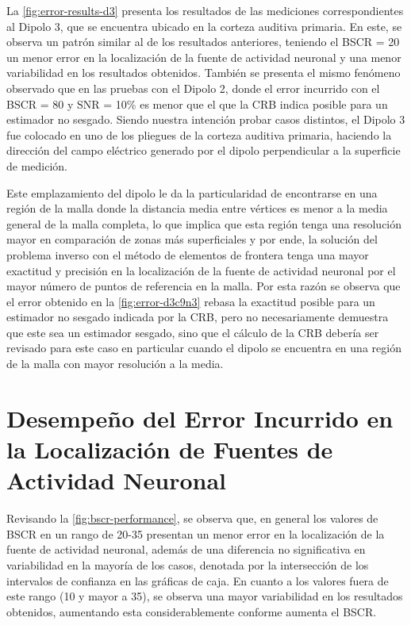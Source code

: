 La \cref{fig:error-results-d3} presenta los resultados de las mediciones correspondientes al Dipolo 3, que se encuentra ubicado en la corteza auditiva primaria. 
En este, se observa un patrón similar al de los resultados anteriores, teniendo el BSCR = 20 un menor error en la localización de la fuente de actividad neuronal y una menor variabilidad en los resultados obtenidos.
También se presenta el mismo fenómeno observado que en las pruebas con el Dipolo 2, donde el error incurrido con el BSCR = 80 y SNR = 10\% es menor que el que la CRB indica posible para un estimador no sesgado.
Siendo nuestra intención probar casos distintos, el Dipolo 3 fue colocado en uno de los pliegues de la corteza auditiva primaria, haciendo la dirección del campo eléctrico generado por el dipolo perpendicular a la superficie de medición.

Este emplazamiento del dipolo le da la particularidad de encontrarse en una región de la malla donde la distancia media entre vértices es menor a la media general de la malla completa, lo que implica que esta región tenga una resolución mayor en comparación de zonas más superficiales y por ende, la solución del problema inverso con el método de elementos de frontera tenga una mayor exactitud y precisión en la localización de la fuente de actividad neuronal por el mayor número de puntos de referencia en la malla.
Por esta razón se observa que el error obtenido en la \cref{fig:error-d3c9n3} rebasa la exactitud posible para un estimador no sesgado indicada por la CRB, pero no necesariamente demuestra que este sea un estimador sesgado, sino que el cálculo de la CRB debería ser revisado para este caso en particular cuando el dipolo se encuentra en una región de la malla con mayor resolución a la media.

\section{Desempeño del Error Incurrido en la Localización de Fuentes de Actividad Neuronal}
\label{sec:discusion:overall}

Revisando la \cref{fig:bscr-performance}, se observa que, en general los valores de BSCR en un rango de 20-35 presentan un menor error en la localización de la fuente de actividad neuronal, además de una diferencia no significativa en variabilidad en la mayoría de los casos, denotada por la intersección de los intervalos de confianza en las gráficas de caja.
En cuanto a los valores fuera de este rango (10 y mayor a 35), se observa una mayor variabilidad en los resultados obtenidos, aumentando esta considerablemente conforme aumenta el BSCR. 

